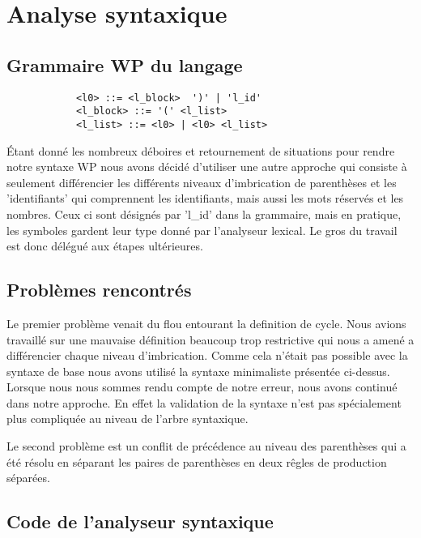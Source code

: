 \section{Analyse syntaxique}
	\subsection{Grammaire WP du langage} 
		\begin{verbatim}
			<l0> ::= <l_block>  ')' | 'l_id'
			<l_block> ::= '(' <l_list>
			<l_list> ::= <l0> | <l0> <l_list>
		\end{verbatim}
		Étant donné les nombreux déboires et retournement de situations
		pour rendre notre syntaxe WP nous avons décidé d'utiliser une
		autre approche qui consiste à seulement différencier les différents
		niveaux d'imbrication de parenthèses et les 'identifiants' qui 
		comprennent les identifiants, mais aussi les mots réservés et les 
		nombres. Ceux ci sont désignés par 'l_id' dans la grammaire, mais
		en pratique, les symboles gardent leur type donné par l'analyseur
		lexical. Le gros du travail est donc délégué aux étapes ultérieures.
	\subsection{Problèmes rencontrés}
		Le premier problème venait du flou entourant la definition de cycle.
		Nous avions travaillé sur une mauvaise définition beaucoup trop 
		restrictive qui nous a amené a différencier chaque niveau d'imbrication.
		Comme cela n'était pas possible avec la syntaxe de base nous avons utilisé
		la syntaxe minimaliste présentée ci-dessus. Lorsque nous nous sommes rendu
		compte de notre erreur, nous avons continué dans notre approche. En effet
		la validation de la syntaxe n'est pas spécialement plus compliquée au niveau
		de l'arbre syntaxique. 
		
		Le second problème est un conflit de précédence au niveau des parenthèses
		qui a été résolu en séparant les paires de parenthèses en deux rêgles
		de production séparées. 
	\subsection{Code de l'analyseur syntaxique}

